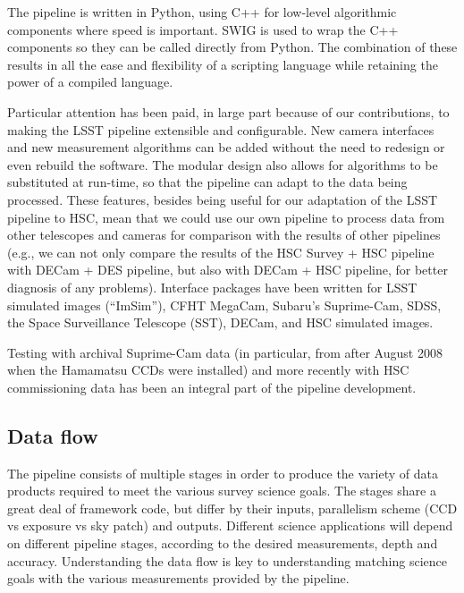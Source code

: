 \documentclass[12pt]{article}
\begin{document}
The pipeline is written in Python, using C++ for low-level algorithmic components where speed is important.
SWIG is used to wrap the C++ components so they can be called directly from Python.  The combination of these
results in all the ease and flexibility of a scripting language while retaining the power of a compiled
language.

Particular attention has been paid, in large part because of our contributions, to making the LSST pipeline
extensible and configurable.  New camera interfaces and new measurement algorithms can be added without the
need to redesign or even rebuild the software.  The modular design also allows for algorithms to be
substituted at run-time, so that the pipeline can adapt to the data being processed.  These features, besides
being useful for our adaptation of the LSST pipeline to HSC, mean that we could use our own pipeline to
process data from other telescopes and cameras for comparison with the results of other pipelines (e.g., we
can not only compare the results of the HSC Survey + HSC pipeline with DECam + DES pipeline, but also with
DECam + HSC pipeline, for better diagnosis of any problems).  Interface packages have been written for LSST
simulated images (``ImSim''), CFHT MegaCam, Subaru's Suprime-Cam, SDSS, the Space Surveillance Telescope
(SST), DECam, and HSC simulated images.

Testing with archival Suprime-Cam data (in particular, from after August 2008 when the Hamamatsu CCDs were
installed) and more recently with HSC commissioning data has been an integral part of the pipeline development.

\subsection{Data flow}

The pipeline consists of multiple stages in order to produce the variety of data products required to meet the
various survey science goals.  The stages share a great deal of framework code, but differ by their inputs,
parallelism scheme (CCD vs exposure vs sky patch) and outputs.  Different science applications will depend on
different pipeline stages, according to the desired measurements, depth and accuracy.  Understanding the data
flow is key to understanding matching science goals with the various measurements provided by the pipeline.
\end{document}
